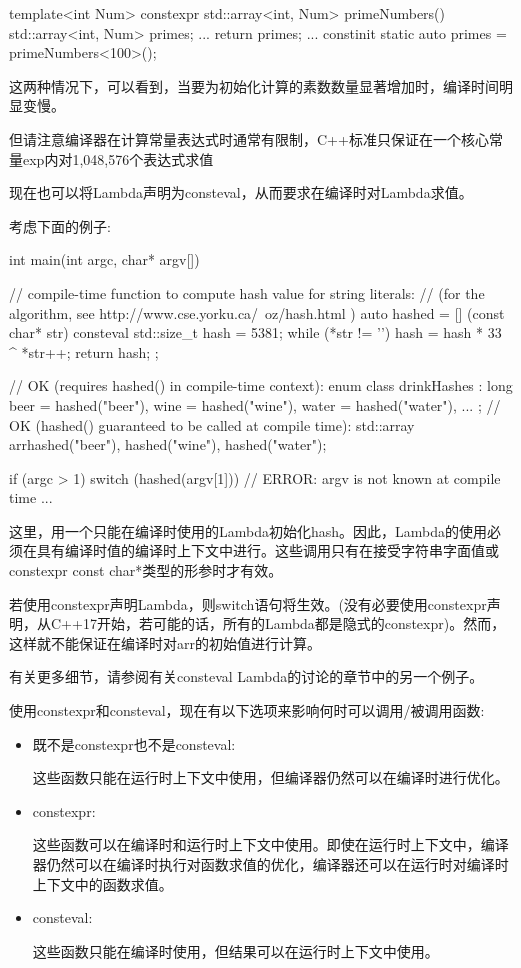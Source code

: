 \begin{cpp}
template<int Num>
constexpr
std::array<int, Num> primeNumbers()
{
	std::array<int, Num> primes;
	...
	return primes;
}
...
constinit static auto primes = primeNumbers<100>();
\end{cpp}

这两种情况下，可以看到，当要为初始化计算的素数数量显著增加时，编译时间明显变慢。

但请注意编译器在计算常量表达式时通常有限制，C++标准只保证在一个核心常量exp内对1,048,576个表达式求值



现在也可以将Lambda声明为consteval，从而要求在编译时对Lambda求值。

考虑下面的例子:

\begin{cpp}
int main(int argc, char* argv[])
{
	// compile-time function to compute hash value for string literals:
	// (for the algorithm, see http://www.cse.yorku.ca/~oz/hash.html )
	auto hashed = [] (const char* str) consteval {
					std::size_t hash = 5381;
					while (*str != '\0') {
						hash = hash * 33 ^ *str++;
					}
					return hash;
				};
	
	// OK (requires hashed() in compile-time context):
	enum class drinkHashes : long { beer = hashed("beer"), wine = hashed("wine"),
									water = hashed("water"), ... };
	// OK (hashed() guaranteed to be called at compile time):
	std::array arr{hashed("beer"), hashed("wine"), hashed("water")};
	
	if (argc > 1) {
		switch (hashed(argv[1])) { // ERROR: argv is not known at compile time
			...
		}
	}
}
\end{cpp}

这里，用一个只能在编译时使用的Lambda初始化hash。因此，Lambda的使用必须在具有编译时值的编译时上下文中进行。这些调用只有在接受字符串字面值或constexpr const char*类型的形参时才有效。

若使用constexpr声明Lambda，则switch语句将生效。(没有必要使用constexpr声明，从C++17开始，若可能的话，所有的Lambda都是隐式的constexpr)。然而，这样就不能保证在编译时对arr的初始值进行计算。

有关更多细节，请参阅有关consteval Lambda的讨论的章节中的另一个例子。


使用constexpr和consteval，现在有以下选项来影响何时可以调用/被调用函数:

\begin{itemize}
\item 
既不是constexpr也不是consteval:

这些函数只能在运行时上下文中使用，但编译器仍然可以在编译时进行优化。

\item 
constexpr: 

这些函数可以在编译时和运行时上下文中使用。即使在运行时上下文中，编译器仍然可以在编译时执行对函数求值的优化，编译器还可以在运行时对编译时上下文中的函数求值。

\item 
consteval: 

这些函数只能在编译时使用，但结果可以在运行时上下文中使用。
\end{itemize}


